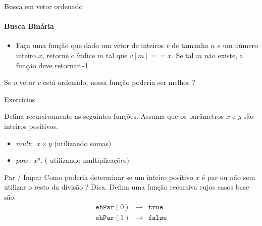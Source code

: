 \documentclass{beamer}
\begin{document}
\begin{frame}{Busca em vetor ordenado}
\framesubtitle{Busca Binária}

\begin{itemize} 
 \item Faça uma função que dado um vetor de inteiros $v$ de tamanho $n$ e um número inteiro $x$, retorne o índice $m$ tal que $v[m]==x$. Se tal $m$ não existe, a função deve retornar  -1.

\end{itemize}

\begin{block}{}
Se o vetor $v$ está ordenado, nossa função poderia ser melhor ? 
\end{block}

\end{frame}


\begin{frame}{Exercícios}

Defina recursivamente as seguintes funções.  Assuma que os parâmetros $x$ e $y$ são inteiros positivos. 
\begin{itemize} 
 \item $mult:$    $x \times y$ (utilizando somas)
 \item $pow:$   $x^y$.  ( utilizando multiplicações) 
\end{itemize}

\begin{block}{Par / Ímpar}
Como poderia determinar se um inteiro positivo $x$ é par ou não sem utilizar o resto da divisão ? Dica. Defina uma função recursiva cujos casos base são:
\[
\begin{array}{lll}
\texttt{ehPar}(0) &\rightarrow &\texttt{true}\\
\texttt{ehPar}(1) &\rightarrow &\texttt{false}
\end{array}
\]
\end{block}
\end{frame}
\end{document}
